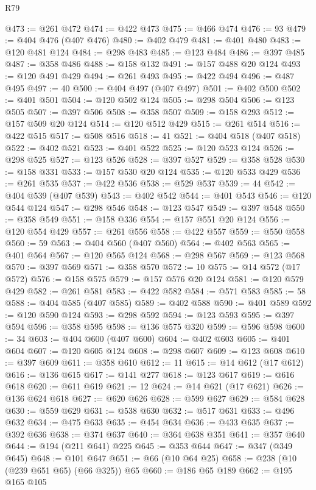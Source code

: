 \begin{lexlean}{R79}
\begin{coremodule}
@473 := @261 @472
@474 := @422 @473
@475 := @466 @474
@476 := 93
@479 := @404 @476 (@407 @476)
@480 := @402 @479
@481 := @401 @480
@483 := @120 @481 @124
@484 := @298 @483
@485 := @123 @484
@486 := @397 @485
@487 := @358 @486
@488 := @158 @132
@491 := @157 @488 @20 @124
@493 := @120 @491 @429
@494 := @261 @493
@495 := @422 @494
@496 := @487 @495
@497 := 40
@500 := @404 @497 (@407 @497)
@501 := @402 @500
@502 := @401 @501
@504 := @120 @502 @124
@505 := @298 @504
@506 := @123 @505
@507 := @397 @506
@508 := @358 @507
@509 := @158 @293
@512 := @157 @509 @20 @124
@514 := @120 @512 @429
@515 := @261 @514
@516 := @422 @515
@517 := @508 @516
@518 := 41
@521 := @404 @518 (@407 @518)
@522 := @402 @521
@523 := @401 @522
@525 := @120 @523 @124
@526 := @298 @525
@527 := @123 @526
@528 := @397 @527
@529 := @358 @528
@530 := @158 @331
@533 := @157 @530 @20 @124
@535 := @120 @533 @429
@536 := @261 @535
@537 := @422 @536
@538 := @529 @537
@539 := 44
@542 := @404 @539 (@407 @539)
@543 := @402 @542
@544 := @401 @543
@546 := @120 @544 @124
@547 := @298 @546
@548 := @123 @547
@549 := @397 @548
@550 := @358 @549
@551 := @158 @336
@554 := @157 @551 @20 @124
@556 := @120 @554 @429
@557 := @261 @556
@558 := @422 @557
@559 := @550 @558
@560 := 59
@563 := @404 @560 (@407 @560)
@564 := @402 @563
@565 := @401 @564
@567 := @120 @565 @124
@568 := @298 @567
@569 := @123 @568
@570 := @397 @569
@571 := @358 @570
@572 := 10
@575 := @14 @572 (@17 @572)
@576 := @158 @575
@579 := @157 @576 @20 @124
@581 := @120 @579 @429
@582 := @261 @581
@583 := @422 @582
@584 := @571 @583
@585 := 58
@588 := @404 @585 (@407 @585)
@589 := @402 @588
@590 := @401 @589
@592 := @120 @590 @124
@593 := @298 @592
@594 := @123 @593
@595 := @397 @594
@596 := @358 @595
@598 := @136 @575 @320
@599 := @596 @598
@600 := 34
@603 := @404 @600 (@407 @600)
@604 := @402 @603
@605 := @401 @604
@607 := @120 @605 @124
@608 := @298 @607
@609 := @123 @608
@610 := @397 @609
@611 := @358 @610
@612 := 11
@615 := @14 @612 (@17 @612)
@616 := @136 @615
@617 := @141 @277
@618 := @123 @617
@619 := @616 @618
@620 := @611 @619
@621 := 12
@624 := @14 @621 (@17 @621)
@626 := @136 @624 @618
@627 := @620 @626
@628 := @599 @627
@629 := @584 @628
@630 := @559 @629
@631 := @538 @630
@632 := @517 @631
@633 := @496 @632
@634 := @475 @633
@635 := @454 @634
@636 := @433 @635
@637 := @392 @636
@638 := @374 @637
@640 := @364 @638 @351
@641 := @357 @640
@644 := @194 (@211 @641) @225
@645 := @353 @644
@647 := @347 (@349 @645)
@648 := @101 @647
@651 := @66 (@10 @64 @25)
@658 := @238 (@10 (@239 @651 @65) (@66 @325)) @65
@660 := @186 @65 @189
@662 := @195 @165 @105

\end{coremodule}
\end{lexlean}
